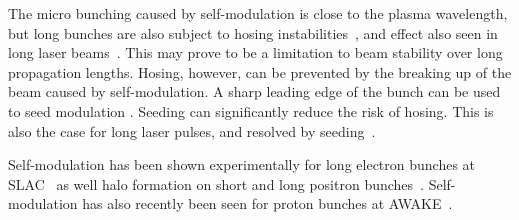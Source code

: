 The micro bunching caused by self-modulation is close to the plasma wavelength, but long bunches are also subject to hosing instabilities~\cite{whittum:1991}, and effect also seen in long laser beams~\cite{duda:1999,duda:2000}. This may prove to be a limitation to beam stability over long propagation lengths. Hosing, however, can be prevented by the breaking up of the beam caused by self-modulation. A sharp leading edge of the bunch can be used to seed modulation \cite{fang:2014}. Seeding can significantly reduce the risk of hosing. This is also the case for long laser pulses, and resolved by seeding~\cite{vieira:2012}. 

Self-modulation has been shown experimentally for long electron bunches at SLAC~\cite{muggli:2014,muggli:2015} as well halo formation on short and long positron bunches~\cite{muggli:2008,hogan:2003}. Self-modulation has also recently been seen for proton bunches at AWAKE~\cite{muggli:2017a}.

